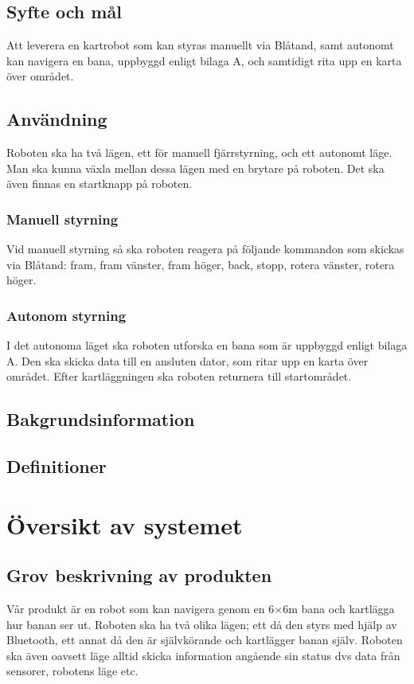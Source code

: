 \documentclass[a4paper,11pt]{article}
\begin{document}
\subsection{Syfte och mål}
Att leverera en kartrobot som kan styras manuellt via Blåtand, samt autonomt kan navigera en bana, uppbyggd enligt bilaga A, och samtidigt rita upp en karta över området.  
\subsection{Användning}
Roboten ska ha två lägen, ett för manuell fjärrstyrning, och ett autonomt läge. Man ska kunna växla mellan dessa lägen med en brytare på roboten. Det ska även finnas en startknapp på roboten. 
\subsubsection{Manuell styrning}
Vid manuell styrning så ska roboten reagera på följande kommandon som skickas via Blåtand: fram, fram vänster, fram höger, back, stopp, rotera vänster, rotera höger. 
\subsubsection{Autonom styrning}
I det autonoma läget ska roboten utforska en bana som är uppbyggd enligt bilaga A. Den ska skicka data till en ansluten dator, som ritar upp en karta över området. Efter kartläggningen ska roboten returnera till startområdet. 
\subsection{Bakgrundsinformation}
\subsection{Definitioner}


\section{Översikt av systemet}

\subsection{Grov beskrivning av produkten}
Vår produkt är en robot som kan navigera genom en 6$ \times $6m bana och kartlägga hur banan ser ut. Roboten ska ha två olika lägen; ett då den styrs med hjälp av Bluetooth, ett annat då den är självkörande och kartlägger banan själv. Roboten ska även oavsett läge alltid skicka information angående sin status dvs data från sensorer, robotens läge etc. 
\end{document}
